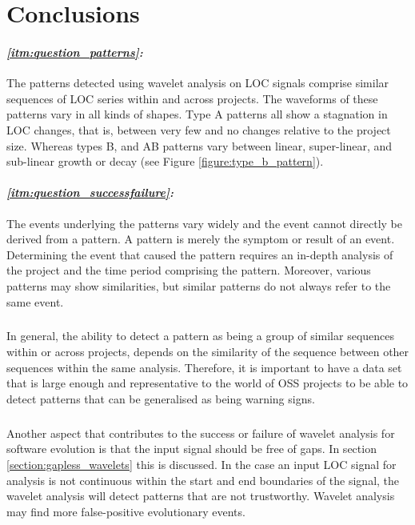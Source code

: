 \chapter{Conclusions}
\label{conclusions}

\begin{comment}
- Patterns AB are false-negatives; the indicate a warning sign in some cases, in
other cases they don't.

\end{comment}

\subsubsection{\textit{\ref{itm:question_patterns}: \subQuestionOne}}
The patterns detected using wavelet analysis on LOC signals comprise similar
sequences of LOC series within and across projects. The waveforms of these
patterns vary in all kinds of shapes. Type A patterns all show a stagnation in
LOC changes, that is, between very few and no changes relative to the project
size. Whereas types B, and AB patterns vary between linear, super-linear, and
sub-linear growth or decay (see Figure \ref{figure:type_b_pattern}).

\subsubsection{\textit{\ref{itm:question_successfailure}: \subQuestionTwo}}
The events underlying the patterns vary widely and the event cannot directly be
derived from a pattern. A pattern is merely the symptom or result of an event.
Determining the event that caused the pattern requires an in-depth analysis of
the project and the time period comprising the pattern. Moreover, various
patterns may show similarities, but similar patterns do not always refer to the
same event.

\paragraph{}
In general, the ability to detect a pattern as being a group of similar
sequences within or across projects, depends on the similarity of the sequence
between other sequences within the same analysis. Therefore, it is important to
have a data set that is large enough and representative to the world of OSS
projects to be able to detect patterns that can be generalised as being warning
signs.

\paragraph{}
Another aspect that contributes to the success or failure of wavelet analysis
for software evolution is that the input signal should be free of gaps. In
section \ref{section:gapless_wavelets} this is discussed. In the case an input
LOC signal for analysis is not continuous within the start and end boundaries
of the signal, the wavelet analysis will detect patterns that are not
trustworthy. Wavelet analysis may find more false-positive evolutionary events.

